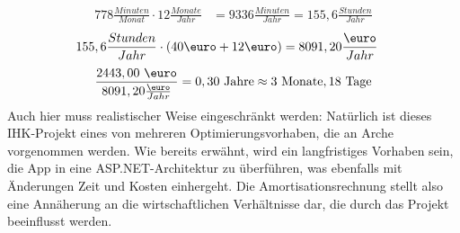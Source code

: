 \documentclass[11pt,toc=sectionentrywithoutdots, 
headheight=44pt, headings=optiontoheadandtoc, hyperfootnotes=false, hypertexnames=false]{scrartcl}
\begin{document}
\begin{align}
    778\frac{Minuten}{Monat}\cdot 12\frac{Monate}{Jahr}&=9336\frac{Minuten}{Jahr}=155,6\frac{Stunden}{Jahr}
\end{align}
\begin{align}
    155,6\frac{Stunden}{Jahr}\cdot(40 \text{\euro} + 12 \text{\euro})&=8091,20\frac{\text{\euro}}{Jahr}
\end{align}
\begin{align}
    \frac{2443,00 \text{ \euro}}{8091,20 \frac{\text{\euro}}{Jahr}}=0,30 \text{ Jahre}
    \approx 3 \text{ Monate}, 18 \text{ Tage}
\end{align}
%
Auch hier muss realistischer Weise eingeschränkt werden: Natürlich ist dieses IHK-Projekt eines von mehreren Optimierungsvorhaben, die an Arche vorgenommen werden. Wie bereits erwähnt, wird ein langfristiges Vorhaben sein, die App in eine ASP.NET-Architektur zu überführen, was ebenfalls mit Änderungen Zeit und Kosten einhergeht. Die Amortisationsrechnung stellt also eine Annäherung an die wirtschaftlichen Verhältnisse dar, die durch das Projekt beeinflusst werden.






\end{document}
